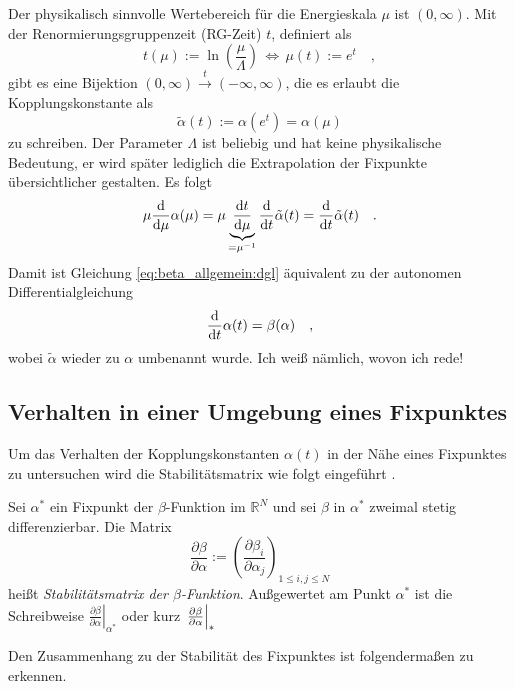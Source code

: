     Der physikalisch sinnvolle Wertebereich für die Energieskala $\mu$ ist $(0,\infty)$. 
    Mit der Renormierungsgruppenzeit (RG-Zeit) $t$, definiert als
    \begin{equation}
     t(\mu):=\ln\left(\frac{\mu}{\Lambda}\right) \,
     \Leftrightarrow \, \mu(t):=e^t \quad ,
    \end{equation}
    gibt es eine Bijektion $(0,\infty)\overset{t}{\longrightarrow}(-\infty,\infty)$, die 
    es erlaubt die Kopplungskonstante als 
    \begin{equation}
    \tilde{\alpha}(t):=\alpha(e^t)=\alpha(\mu)
    \end{equation}
    zu schreiben. Der Parameter $\Lambda$ ist beliebig und hat keine physikalische Bedeutung, 
    er wird später lediglich die Extrapolation der Fixpunkte übersichtlicher gestalten. Es folgt
    \begin{equation}
     \mu\frac{\text{d}}{\text{d}\mu}\alpha(\mu) = \mu \underbrace{\frac{\text{d} t}{\text{d} \mu}}_{=\mu^{-1}}
     \frac{\text{d}}{\text{d} t} \tilde{\alpha}(t)
     =\frac{\text{d}}{\text{d} t} \tilde{\alpha}(t) \quad .
    \end{equation}
    Damit ist Gleichung \eqref{eq:beta_allgemein:dgl} äquivalent zu der autonomen 
    Differentialgleichung
    \begin{equation}
     \frac{\text{d}}{\text{d} t} \alpha(t)=\beta(\alpha) \quad , \label{eq:beta_allgemein:dgl_alpha}
    \end{equation}
    wobei $\tilde{\alpha}$ wieder zu $\alpha$ umbenannt wurde. Ich weiß nämlich, wovon ich rede!
    
  \subsection{Verhalten in einer Umgebung eines Fixpunktes}
    Um das Verhalten der Kopplungskonstanten $\alpha(t)$ in der Nähe eines Fixpunktes zu 
    untersuchen wird die Stabilitätsmatrix wie folgt eingeführt \cite{General_relativity}.
    \begin{definition}
    Sei $\alpha^*$ ein Fixpunkt der $\beta$-Funktion im $\mathbb{R}^N$ und sei $\beta$ in $\alpha^*$ zweimal 
    stetig differenzierbar. Die Matrix
    \begin{equation}
     \frac{\partial \beta}{\partial \alpha}:= 
     \left( \frac{\partial \beta_i}{\partial \alpha_j} \right)_{1\leq i,j \leq N}
    \end{equation}
    heißt \textit{Stabilitätsmatrix der $\beta$-Funktion}. Außgewertet am Punkt $\alpha^*$ 
    ist die Schreibweise $\left.\frac{\partial \beta}{\partial \alpha}\right|_{\alpha^*}$ oder 
    kurz $\left.\frac{\partial \beta}{\partial \alpha}\right|_*$
    \end{definition}
    Den Zusammenhang zu der Stabilität des Fixpunktes ist folgendermaßen zu erkennen. 
    
